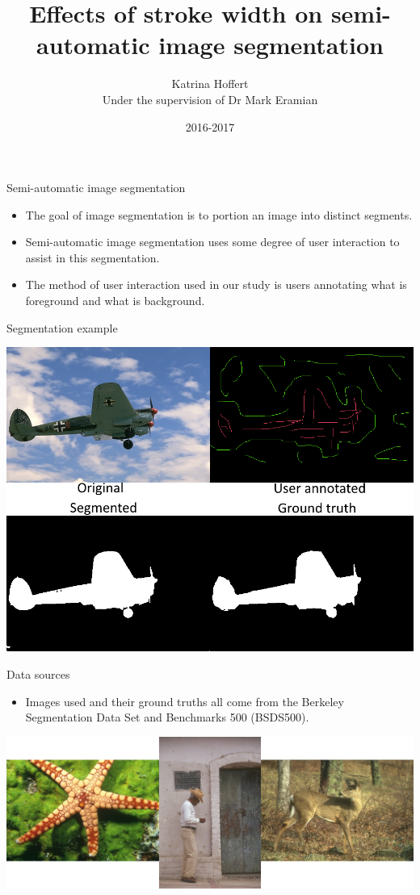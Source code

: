 \documentclass[14pt,xcolor=dvipsnames]{beamer}
\title[Stroke width on image segmentation]{Effects of stroke width on semi-automatic image segmentation}
\author[Katrina Hoffert, Mark Eramian]{Katrina Hoffert \\ Under the supervision of Dr Mark Eramian}
\date{2016-2017}
\begin{document}
\begin{frame}[plain]
	\titlepage
\end{frame}
\addtocounter{framenumber}{-1}

\begin{frame}[fragile,t]{Semi-automatic image segmentation}
	\begin{itemize}
		\item The goal of image segmentation is to portion an image into distinct segments.
		\item Semi-automatic image segmentation uses some degree of user interaction to assist in this segmentation.
		\item The method of user interaction used in our study is users annotating what is foreground and what is background.
	\end{itemize}
\end{frame}

\begin{frame}[fragile,t]{Segmentation example}
	\begin{center}
		\includegraphics[width=\paperheight]{example_combined}
	\end{center}
\end{frame}

\begin{frame}[fragile,t]{Data sources}
	\begin{itemize}
		\item Images used and their ground truths all come from the Berkeley Segmentation Data Set and Benchmarks 500 (BSDS500).
	\end{itemize}
	\begin{center}
		\includegraphics[width=\paperheight]{bsds500_samples}
	\end{center}
\end{frame}
\end{document}
